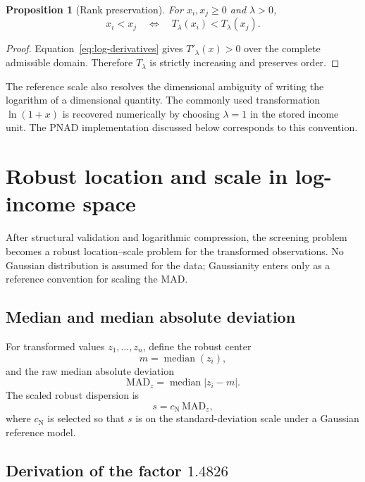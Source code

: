 \documentclass[12pt]{article}
\newcommand{\be}{\begin{equation}}
\newcommand{\ee}{\end{equation}}
\newtheorem{proposition}{Proposition}[section]
\numberwithin{equation}{section}
\begin{document}
\begin{proposition}[Rank preservation]
For $x_i,x_j\geq0$ and $\lambda>0$,
\be
x_i<x_j
\quad\Longleftrightarrow\quad
T_{\lambda}(x_i)<T_{\lambda}(x_j).
\label{eq:rank-preservation}
\ee
\end{proposition}

\begin{proof}
Equation~\eqref{eq:log-derivatives} gives $T'_{\lambda}(x)>0$ over the complete admissible domain. Therefore $T_{\lambda}$ is strictly increasing and preserves order.
\end{proof}

The reference scale also resolves the dimensional ambiguity of writing the logarithm of a dimensional quantity. The commonly used transformation $\ln(1+x)$ is recovered numerically by choosing $\lambda=1$ in the stored income unit. The PNAD implementation discussed below corresponds to this convention.

\section{Robust location and scale in log-income space}

After structural validation and logarithmic compression, the screening problem becomes a robust location--scale problem for the transformed observations. No Gaussian distribution is assumed for the data; Gaussianity enters only as a reference convention for scaling the MAD.

\subsection{Median and median absolute deviation}

For transformed values $z_1,\ldots,z_n$, define the robust center
\be
m
=
\operatorname{median}(z_i),
\label{eq:median}
\ee
and the raw median absolute deviation
\be
\mathrm{MAD}_{z}
=
\operatorname{median}\left|z_i-m\right|.
\label{eq:mad-raw}
\ee
The scaled robust dispersion is
\be
s
=
c_{\mathrm{N}}\,\mathrm{MAD}_{z},
\label{eq:mad-scaled}
\ee
where $c_{\mathrm{N}}$ is selected so that $s$ is on the standard-deviation scale under a Gaussian reference model.

\subsection{Derivation of the factor $1.4826$}
\end{document}
